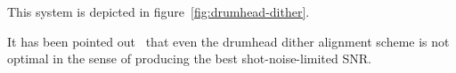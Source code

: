This system is depicted in figure~\ref{fig:drumhead-dither}.


It has been pointed out~\cite{Smith2011Optimal} that even the drumhead
dither alignment scheme is not optimal in the sense of producing the
best shot-noise-limited SNR.

